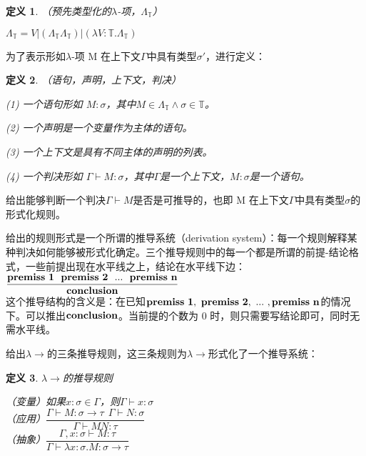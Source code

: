 \documentclass[UTF8]{article}
\newtheorem{thm}{定义}[section]
\begin{document}
		\begin{thm}（预先类型化的$\lambda$-项，$\Lambda_\mathbb{T}$）
			
			$\Lambda_\mathbb{T} = V|(\Lambda_\mathbb{T}\Lambda_\mathbb{T})|(\lambda V:\mathbb{T}.\Lambda_\mathbb{T})$
		\end{thm}
		
		为了表示形如$\lambda$-项 M 在上下文$\Gamma$中具有类型$\sigma'$，进行定义：
		
		\begin{thm}（语句，声明，上下文，判决）
			
			(1) 一个语句形如 $M:\sigma$，其中$M\in\Lambda_\mathbb{T} \land\sigma\in\mathbb{T}$。
			
			(2) 一个声明是一个变量作为主体的语句。
			
			(3) 一个上下文是具有不同主体的声明的列表。
			
			(4) 一个判决形如 $\Gamma\vdash M:\sigma$，其中$\Gamma$是一个上下文，$M:\sigma$是一个语句。
		\end{thm}
	
		给出能够判断一个判决$\Gamma\vdash M$是否是可推导的，也即 M 在上下文$\Gamma$中具有类型$\sigma$的形式化规则。
		
		给出的规则形式是一个所谓的推导系统（derivation system）：每一个规则解释某种判决如何能够被形式化确定。三个推导规则中的每一个都是所谓的前提-结论格式，一些前提出现在水平线之上，结论在水平线下边：\\
		
			$\bf\dfrac{premiss\ 1\ \ premiss\ 2\ \ ...\ \ premiss\ n}{conclusion}$\\
		
		这个推导结构的含义是：在已知$\bf premiss\ 1,\ premiss\ 2,\ ...\ ,premiss\ n$的情况下。可以推出$\bf conclusion$。当前提的个数为 0 时，则只需要写结论即可，同时无需水平线。
		
		给出$\lambda{\rightarrow}$的三条推导规则，这三条规则为$\lambda{\rightarrow}$形式化了一个推导系统：
		
		\begin{thm} $\lambda{\rightarrow}$的推导规则
			
			（变量）如果$x:\sigma\in\Gamma$，则$\Gamma\vdash x:\sigma$\\
			
			（应用）$\dfrac{\Gamma\vdash M:\sigma\rightarrow\tau\ \ \Gamma\vdash N:\sigma}{\Gamma\vdash MN:\tau}$\\
			
			（抽象）$\dfrac{\Gamma,x:\sigma\vdash M:\tau}{\Gamma\vdash\lambda x:\sigma.M:\sigma\rightarrow\tau}$\\
			
		\end{thm}
	
\end{document}
